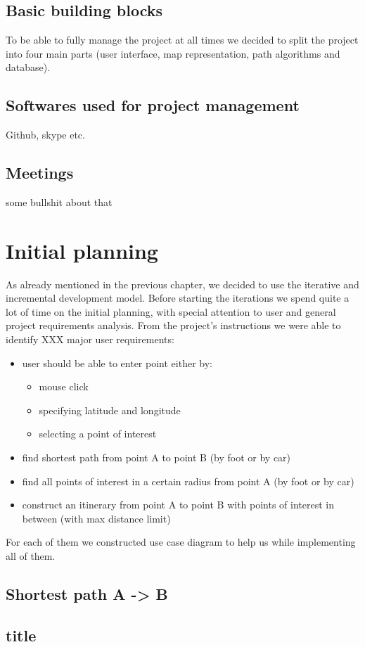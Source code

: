 \documentclass[reqno,openany,12pt]{amsbook}
\theoremstyle{definition}
\theoremstyle{remark}
\begin{document}
\section{Basic building blocks}
To be able to fully manage the project at all times we decided to split the project into four main parts (user interface, map representation, path algorithms and database).  
\section{Softwares used for project management}
Github, skype etc.
\section{Meetings}
some bullshit about that

\chapter{Initial planning}
As already mentioned in the previous chapter, we decided to use the iterative and incremental development model. Before starting the iterations we spend quite a lot of time on the initial planning, with special attention to user and general project requirements analysis. From the project's instructions we were able to identify XXX major user requirements:
\begin{itemize}
\item user should be able to enter point either by:
\begin{itemize}
\item mouse click
\item specifying latitude and longitude
\item selecting a point of interest
\end{itemize}
\item find shortest path from point A to point B (by foot or by car)
\item find all points of interest in a certain radius from point A (by foot or by car)
\item construct an itinerary from point A to point B with points of interest in between (with max distance limit)
\end{itemize}
For each of them we constructed use case diagram to help us while implementing all of them.
\section{Shortest path A -> B}
\section{title}
\end{document}
